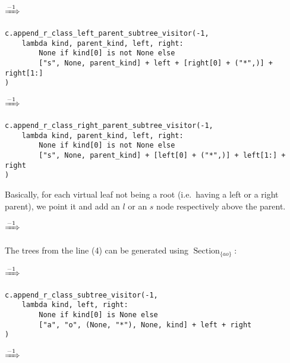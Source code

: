 \documentclass[final]{article}
\theoremstyle{definition}
\theoremstyle{definition}
\theoremstyle{remark}
\DeclareMathOperator{\tSection}{\text{Section}}
\newcommand{\includeinlinesvg}[2]{\begin{minipage}{#1\textwidth}\end{minipage}}
\newcommand{\includeinlinescaledsvg}[3]{\begin{minipage}{#1\textwidth}\begin{center}\end{center}\end{minipage}}
\begin{document}
\begin{center}
    \includeinlinescaledsvg{.4}{.7}{lambda__transformations__006a}%
    \(\xRightarrow{-1}\)%
    \includeinlinescaledsvg{.4}{.7}{lambda__transformations__006b}%
\end{center}

\begin{lstlisting}
c.append_r_class_left_parent_subtree_visitor(-1,
    lambda kind, parent_kind, left, right:
        None if kind[0] is not None else
        ["s", None, parent_kind] + left + [right[0] + ("*",)] + right[1:]
)
\end{lstlisting}

\begin{center}
    \includeinlinescaledsvg{.4}{.7}{lambda__transformations__007a}%
    \(\xRightarrow{-1}\)%
    \includeinlinescaledsvg{.4}{.7}{lambda__transformations__007b}%
\end{center}

\begin{lstlisting}
c.append_r_class_right_parent_subtree_visitor(-1,
    lambda kind, parent_kind, left, right:
        None if kind[0] is not None else
        ["s", None, parent_kind] + [left[0] + ("*",)] + left[1:] + right
)
\end{lstlisting}

Basically, for each virtual leaf not being a root (i.e.~having a left or a right parent), we point it and add an \(l\) or an \(s\) node respectively above the parent.

\includeinlinesvg{.32}{lambda__trees_111__1_base}%
\(\xRightarrow{-1}\)%
\includeinlinesvg{.32}{lambda__trees_101__0}%
\includeinlinesvg{.32}{lambda__trees_112__0}%

The trees from the line (4) can be generated using \(\tSection_{\{ao\}}\):

\begin{center}
    \includeinlinescaledsvg{.4}{.7}{lambda__transformations__008a}%
    \(\xRightarrow{-1}\)%
    \includeinlinescaledsvg{.4}{.7}{lambda__transformations__008b}%
\end{center}

\begin{lstlisting}
c.append_r_class_subtree_visitor(-1,
    lambda kind, left, right:
        None if kind[0] is None else
        ["a", "o", (None, "*"), None, kind] + left + right
)
\end{lstlisting}

\begin{center}
    \includeinlinescaledsvg{.4}{.7}{lambda__transformations__009a}%
    \(\xRightarrow{-1}\)%
    \includeinlinescaledsvg{.4}{.7}{lambda__transformations__009b}%
\end{center}
\end{document}
